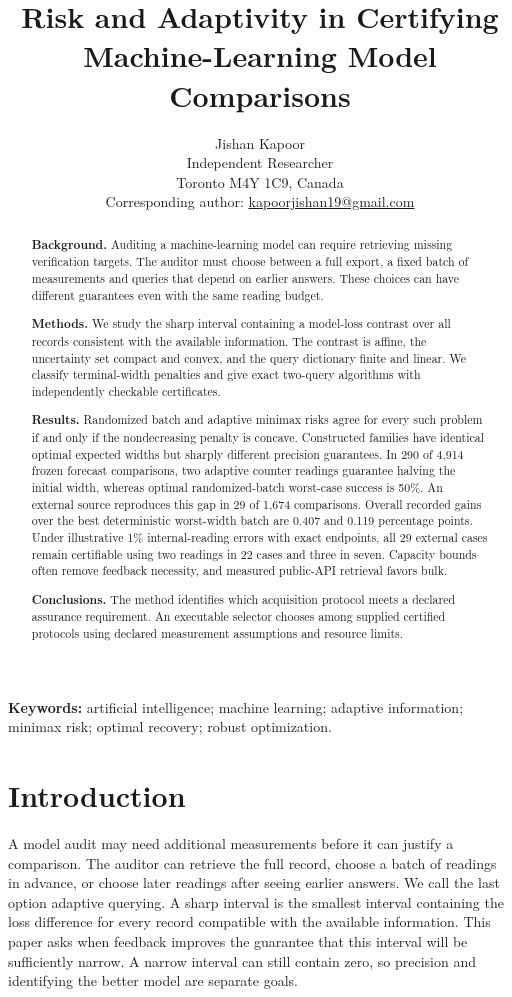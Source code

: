 \documentclass[12pt]{article}
\title{Risk and Adaptivity in Certifying Machine-Learning Model Comparisons}
\author{Jishan Kapoor\\Independent Researcher\\Toronto M4Y 1C9, Canada\\
Corresponding author: \href{mailto:kapoorjishan19@gmail.com}{kapoorjishan19@gmail.com}}
\date{}
\begin{document}
\maketitle
\begin{abstract}
\textbf{Background.} Auditing a machine-learning model can require retrieving
missing verification targets. The auditor must choose between a full export,
a fixed batch of measurements and queries that depend on earlier answers.
These choices can have different guarantees even with the same reading budget.

\textbf{Methods.} We study the sharp interval containing a model-loss contrast
over all records consistent with the available information. The contrast is
affine, the uncertainty set compact and convex, and the query dictionary finite
and linear. We classify terminal-width penalties and give exact two-query
algorithms with independently checkable certificates.

\textbf{Results.} Randomized batch and adaptive minimax risks agree for every
such problem if and only if the nondecreasing penalty is concave. Constructed
families have identical optimal expected widths but sharply different precision
guarantees. In 290 of 4,914 frozen forecast comparisons, two adaptive counter
readings guarantee halving the initial width, whereas optimal randomized-batch
worst-case success is 50\%. An external source reproduces this gap in 29 of
1,674 comparisons. Overall recorded gains over the best deterministic
worst-width batch are 0.407 and 0.119 percentage points. Under illustrative
1\% internal-reading errors with exact endpoints, all 29 external cases remain
certifiable using two readings in 22 cases and three in seven. Capacity bounds
often remove feedback necessity, and measured public-API retrieval favors bulk.

\textbf{Conclusions.} The method identifies which acquisition protocol meets
a declared assurance requirement. An executable selector chooses among supplied certified protocols using
declared measurement assumptions and resource limits.
\end{abstract}
\noindent\textbf{Keywords:} artificial intelligence; machine learning;
adaptive information; minimax risk; optimal recovery; robust optimization.

\section{Introduction}
A model audit may need additional measurements before it can justify a
comparison. The auditor can retrieve the full record, choose a batch of
readings in advance, or choose later readings after seeing earlier answers.
We call the last option adaptive querying. A sharp interval is the smallest
interval containing the loss difference for every record compatible with
the available information. This paper asks when feedback improves the
guarantee that this interval will be sufficiently narrow. A narrow interval
can still contain zero, so precision and identifying the better model are
separate goals.
\end{document}
